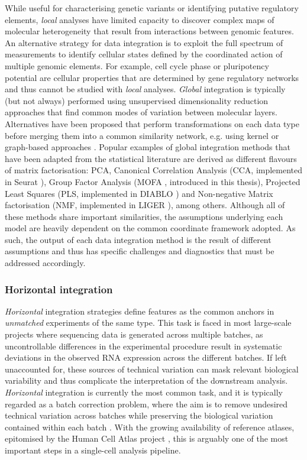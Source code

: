 While useful for characterising genetic variants or identifying putative regulatory elements, \textit{local} analyses have limited capacity to discover complex maps of molecular heterogeneity that result from interactions between genomic features. An alternative strategy for data integration is to exploit the full spectrum of measurements to identify cellular states defined by the coordinated action of multiple genomic elements. For example, cell cycle phase or pluripotency potential are cellular properties that are determined by gene regulatory networks and thus cannot be studied with \textit{local} analyses. \textit{Global} integration is typically (but not always) performed using unsupervised dimensionality reduction approaches that find common modes of variation between molecular layers. Alternatives have been proposed that perform transformations on each data type before merging them into a common similarity network, e.g. using kernel or graph-based approaches \cite{Lanckriet2004, Wang2014}. Popular examples of global integration methods that have been adapted from the statistical literature are derived as different flavours of matrix factorisation: PCA, Canonical Correlation Analysis (CCA, implemented in Seurat \cite{Butler2018}), Group Factor Analysis (MOFA \cite{Argelaguet2018,Argelaguet2019}, introduced in this thesis), Projected Least Squares (PLS, implemented in DIABLO \cite{Singh2018}) and Non-negative Matrix factorisation (NMF, implemented in LIGER \cite{Welch2019}), among others. Although all of these methods share important similarities, the assumptions underlying each model are heavily dependent on the common coordinate framework adopted. As such, the output of each data integration method is the result of different assumptions and thus has specific challenges and diagnostics that must be addressed accordingly.

\subsubsection{Horizontal integration}

\textit{Horizontal} integration strategies define features as the common anchors in \textit{unmatched} experiments of the same type. This task is faced in most large-scale projects where sequencing data is generated across multiple batches, as uncontrollable differences in the experimental procedure result in systematic deviations in the observed RNA expression across the different batches. If left unaccounted for, these sources of technical variation can mask relevant biological variability and thus complicate the interpretation of the downstream analysis. \textit{Horizontal} integration is currently the most common task, and it is typically regarded as a batch correction problem, where the aim is to remove undesired technical variation across batches while preserving the biological variation contained within each batch \cite{Tran2020}. With the growing availability of reference atlases, epitomised by the Human Cell Atlas project \cite{Aviv2017}, this is arguably one of the most important steps in a single-cell analysis pipeline. 

